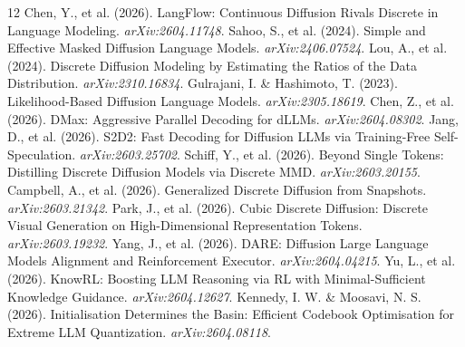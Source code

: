 \documentclass[11pt]{article}
\begin{document}
\begin{thebibliography}{12}
 Chen, Y., et al. (2026). LangFlow: Continuous Diffusion Rivals Discrete in Language Modeling. \textit{arXiv:2604.11748}.
 Sahoo, S., et al. (2024). Simple and Effective Masked Diffusion Language Models. \textit{arXiv:2406.07524}.
 Lou, A., et al. (2024). Discrete Diffusion Modeling by Estimating the Ratios of the Data Distribution. \textit{arXiv:2310.16834}.
 Gulrajani, I. \& Hashimoto, T. (2023). Likelihood-Based Diffusion Language Models. \textit{arXiv:2305.18619}.
 Chen, Z., et al. (2026). DMax: Aggressive Parallel Decoding for dLLMs. \textit{arXiv:2604.08302}.
 Jang, D., et al. (2026). S2D2: Fast Decoding for Diffusion LLMs via Training-Free Self-Speculation. \textit{arXiv:2603.25702}.
 Schiff, Y., et al. (2026). Beyond Single Tokens: Distilling Discrete Diffusion Models via Discrete MMD. \textit{arXiv:2603.20155}.
 Campbell, A., et al. (2026). Generalized Discrete Diffusion from Snapshots. \textit{arXiv:2603.21342}.
 Park, J., et al. (2026). Cubic Discrete Diffusion: Discrete Visual Generation on High-Dimensional Representation Tokens. \textit{arXiv:2603.19232}.
 Yang, J., et al. (2026). DARE: Diffusion Large Language Models Alignment and Reinforcement Executor. \textit{arXiv:2604.04215}.
 Yu, L., et al. (2026). KnowRL: Boosting LLM Reasoning via RL with Minimal-Sufficient Knowledge Guidance. \textit{arXiv:2604.12627}.
 Kennedy, I. W. \& Moosavi, N. S. (2026). Initialisation Determines the Basin: Efficient Codebook Optimisation for Extreme LLM Quantization. \textit{arXiv:2604.08118}.
\end{thebibliography}
\end{document}
